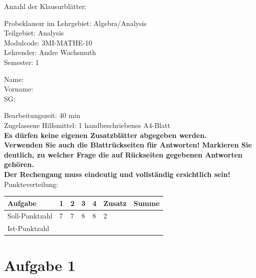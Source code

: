 \documentclass[12pt]{article}
\begin{document}
\thispagestyle{firstpage}

\begin{flushright}
Anzahl der Klausurblätter: \pageref*{LastTask}
\end{flushright}

Probeklausur im Lehrgebiet: Algebra/Analysis\\

Teilgebiet: Analysis \\

Modulcode: 3MI-MATHE-10 \\

Lehrender: Andre Wachsmuth \\

Semester: 1 \\

\begin{vwcol}[widths={0.4,0.4,0.2},sep=0cm, justify=flush,rule=0pt,indent=4em]
Name:\\
Vorname:\\
SG:
\end{vwcol}

\bigskip
\bigskip
\bigskip
Bearbeitungszeit: 40 min \\

Zugelassene Hilfsmittel: 1 handbeschriebenes A4-Blatt \\

\textbf{Es dürfen keine eigenen Zusatzblätter abgegeben werden.} \\

\textbf{Verwenden Sie auch die Blattrückseiten für Antworten! Markieren Sie deutlich, zu welcher Frage die auf Rückseiten gegebenen Antworten gehören.} \\

\textbf {Der Rechengang muss eindeutig und vollständig ersichtlich sein!} \\

Punkteverteilung:

\bigskip

\begin{tabularx}{\textwidth}{l|Y|Y|Y|Y|Y|Y}
Aufgabe        & 1 & 2 & 3 & 4  & Zusatz & Summe \\ [1ex] \hline
Soll-Punktzahl & 7 & 7 & 8 & 8  & 2      &       \\ [3ex]
Ist-Punktzahl  &   &   &   &    &        &       \\ [3ex]
\end{tabularx}

\newpage
\section* {Aufgabe 1}
\end{document}
